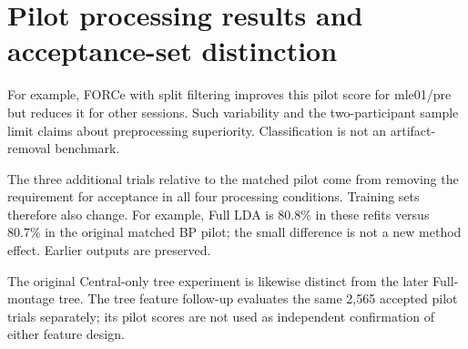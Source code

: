 \documentclass[11pt,a4paper]{article}
\begin{document}
\clearpage
\section{Pilot processing results and acceptance-set distinction}\label{app:pilot}
\begin{table}[H]\centering\small\setlength{\tabcolsep}{4pt}

\caption{Full-montage 100 ms LDA BA (\%) for each matched pilot session. Conditions are defined in Table~\ref{tab:pilot_processing}. All use the same 2,562 trial IDs, so changes here do not arise from different accepted trial sets.}\label{tab:pilot_sessions}
\end{table}
For example, FORCe with split filtering improves this pilot score for mle01/pre but reduces it for other sessions. Such variability and the two-participant sample limit claims about preprocessing superiority. Classification is not an artifact-removal benchmark.

\begin{table}[H]\centering\small

\caption{The two pilots refitted under the later \emph{all-accepted no-FORCe} protocol: 2,565 trials, six sessions. Percentages except AUC. These rows accompany the fixed validation results but are not counted among the 23 validation participants.}\label{tab:pilot_refit}
\end{table}
The three additional trials relative to the matched pilot come from removing the requirement for acceptance in all four processing conditions. Training sets therefore also change. For example, Full LDA is 80.8\% in these refits versus 80.7\% in the original matched BP pilot; the small difference is not a new method effect. Earlier outputs are preserved.

The original Central-only tree experiment is likewise distinct from the later Full-montage tree. The tree feature follow-up evaluates the same 2,565 accepted pilot trials separately; its pilot scores are not used as independent confirmation of either feature design.
\end{document}
